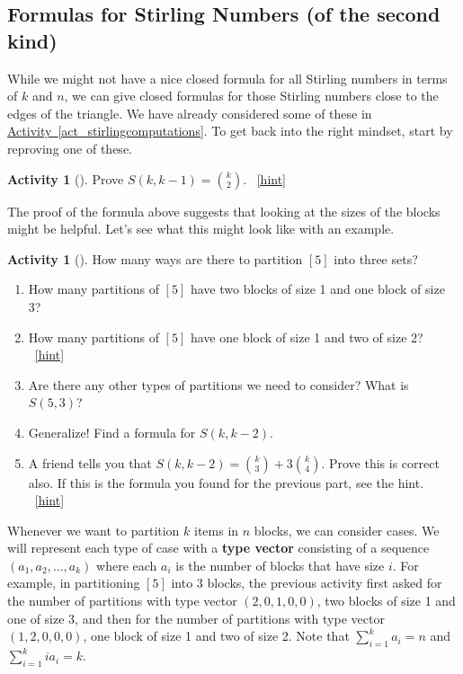 \documentclass[10pt,]{book}
\newcommand{\terminology}[1]{\textbf{#1}}
\theoremstyle{plain}
\theoremstyle{definition}
\theoremstyle{definition}
\theoremstyle{definition}
\newtheorem{activity}[project]{Activity}
\numberwithin{equation}{chapter}
\begin{document}
\subsection[{Formulas for Stirling Numbers (of the second kind)}]{Formulas for Stirling Numbers (of the second kind)}\label{subsec-stirlingformulas}
\hypertarget{p-981}{}%
While we might not have a nice closed formula for all Stirling numbers in terms of \(k\) and \(n\), we can give closed formulas for those Stirling numbers close to the edges of the triangle.  We have already considered some of these in \hyperref[act_stirlingcomputations]{Activity~\ref{act_stirlingcomputations}}.  To get back into the right mindset, start by reproving one of these.%
\begin{activity}[]\label{activity-211}
\hypertarget{p-982}{}%
Prove \(S(k, k-1) = \binom{k}{2}\).%
~\hfill{\tiny\hyperlink{a-211}{[hint]}\hypertarget{q-211}{}}\end{activity}
\hypertarget{p-985}{}%
The proof of the formula above suggests that looking at the sizes of the blocks might be helpful.  Let's see what this might look like with an example.%
\begin{activity}[]\label{activity-212}
\hypertarget{p-986}{}%
How many ways are there to partition \([5]\) into three sets?%
\begin{enumerate}[font=\bfseries,label=(\alph*),ref=\alph*]
\item\label{task-185} \hypertarget{p-987}{}%
How many partitions of \([5]\) have two blocks of size 1 and one block of size 3?%
\item\label{task-186} \hypertarget{p-989}{}%
How many partitions of \([5]\) have one block of size 1 and two of size 2?%
~\hfill{\tiny\hyperlink{a-212.b}{[hint]}\hypertarget{q-212.b}{}}\item\label{task-187} \hypertarget{p-992}{}%
Are there any other types of partitions we need to consider?  What is \(S(5,3)\)?%
\item\label{task-188} \hypertarget{p-994}{}%
Generalize! Find a formula for \(S(k, k-2)\).%
\item\label{task-189} \hypertarget{p-996}{}%
A friend tells you that \(S(k,k-2) = \binom{k}{3} + 3 \binom{k}{4}\).  Prove this is correct also.  If this is the formula you found for the previous part, see the hint.%
~\hfill{\tiny\hyperlink{a-212.e}{[hint]}\hypertarget{q-212.e}{}}\end{enumerate}
\end{activity}
\hypertarget{p-999}{}%
 Whenever we want to partition \(k\) items in \(n\) blocks, we can consider cases.  We will represent each type of case with a \terminology{type vector} consisting of a sequence \((a_1, a_2, \ldots, a_k)\) where each \(a_i\) is the number of blocks that have size \(i\).  For example, in partitioning \([5]\) into 3 blocks, the previous activity first asked for the number of partitions with type vector \((2,0,1,0,0)\), two blocks of size 1 and one of size 3, and then for the number of partitions with type vector \((1,2,0,0,0)\), one block of size 1 and two of size 2.  Note that \(\sum_{i=1}^k a_i = n\) and \(\sum_{i=1}^k ia_i = k\).%
\end{document}

